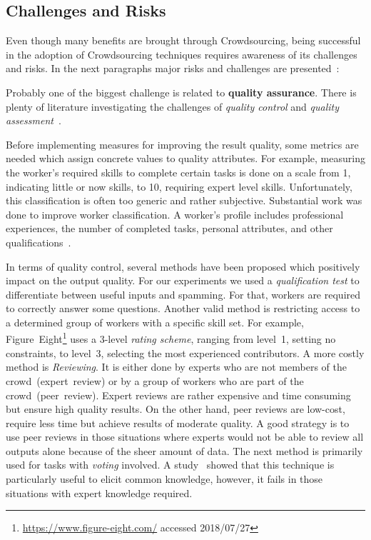 \subsection{Challenges and Risks}
Even though many benefits are brought through Crowdsourcing, being successful in the adoption of Crowdsourcing techniques requires awareness of its challenges and risks. In the next paragraphs major risks and challenges are presented~\cite{hossfeld2013}:

Probably one of the biggest challenge is related to \textbf{quality assurance}. There is plenty of literature investigating the challenges of \emph{quality control} and \emph{quality assessment}~\cite{allahbakhsh2013, daniel2018, hansen2013, hsueh2009}.

Before implementing measures for improving the result quality, some metrics are needed which assign concrete values to quality attributes. For example, measuring the worker's required skills to complete certain tasks is done on a scale from 1, indicating little or now skills, to 10, requiring expert level skills. Unfortunately, this classification is often too generic and rather subjective. Substantial work was done to improve worker classification. A worker's profile includes professional experiences, the number of completed tasks, personal attributes, and other qualifications~\cite{daniel2018}. 

In terms of quality control, several methods have been proposed which positively impact on the output quality. 
For our experiments we used a \emph{qualification test} to differentiate between useful inputs and spamming. For that, workers are required to correctly answer some questions. Another valid method is restricting access to a determined group of workers with a specific skill set. For example, Figure~Eight\footnote{\url{https://www.figure-eight.com/} accessed 2018/07/27} uses a 3-level \emph{rating scheme}, ranging from level~1, setting no constraints, to level~3, selecting the most experienced contributors. A more costly method is \emph{Reviewing}. It is either done by experts who are not members of the crowd~(expert~review) or by a group of workers who are part of the crowd~(peer~review). Expert reviews are rather expensive and time consuming but ensure high quality results. On the other hand, peer reviews are low-cost, require less time but achieve results of moderate quality. A good strategy is to use peer reviews in those situations where experts would not be able to review all outputs alone because of the sheer amount of data. 
The next method is primarily used for tasks with \emph{voting} involved. A study~\cite{waggoner2014} showed that this technique is particularly useful to elicit common knowledge, however, it fails in those situations with expert knowledge required. 


